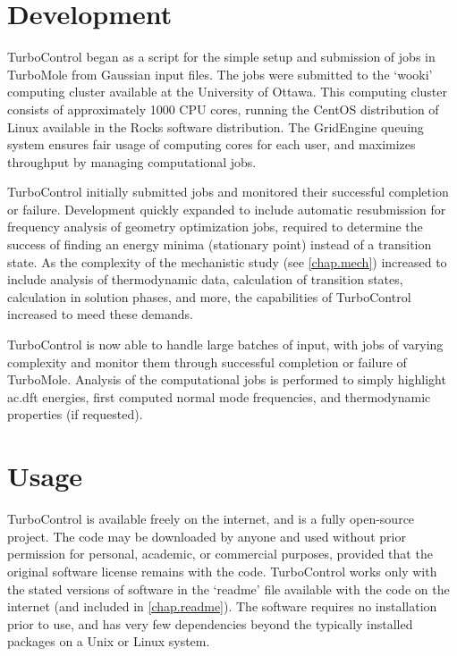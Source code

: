 \section{Development}

TurboControl began as a script for the simple setup and submission of jobs in TurboMole from Gaussian input files. The jobs were submitted to the `wooki' computing cluster available at the University of Ottawa. This computing cluster consists of approximately 1000 CPU cores, running the CentOS distribution of Linux available in the Rocks software distribution. The GridEngine queuing system ensures fair usage of computing cores for each user, and maximizes throughput by managing computational jobs. 

TurboControl initially submitted jobs and monitored their successful completion or failure. Development quickly expanded to include automatic resubmission for frequency analysis of geometry optimization jobs, required to determine the success of finding an energy minima (stationary point) instead of a transition state. As the complexity of the mechanistic study (see \autoref{chap.mech}) increased to include analysis of thermodynamic data, calculation of transition states, calculation in solution phases, and more, the capabilities of TurboControl increased to meed these demands. 

TurboControl is now able to handle large batches of input, with jobs of varying complexity and monitor them through successful completion or failure of TurboMole. Analysis of the computational jobs is performed to simply highlight \gls{ac.dft} energies, first computed normal mode frequencies, and thermodynamic properties (if requested). 

\section{Usage}

TurboControl is available freely on the internet, and is a fully open-source project\autocite{bulsink2014}. The code may be downloaded by anyone and used without prior permission for personal, academic, or commercial purposes, provided that the original software license remains with the code. TurboControl works only with the stated versions of software in the `readme' file available with the code on the internet (and included in \autoref{chap.readme}). The software requires no installation prior to use, and has very few dependencies beyond the typically installed packages on a Unix or Linux system. 

